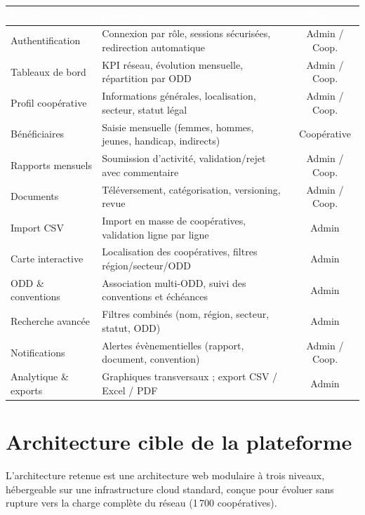 \documentclass[11pt,a4paper]{article}
\begin{document}
\begin{center}
\small
\renewcommand{\arraystretch}{1.18}
\begin{tabularx}{\textwidth}{@{}l Y c@{}}
\toprule
{}
\textcolor{white}{\textbf{Module}} & \textcolor{white}{\textbf{Fonction}} & \textcolor{white}{\textbf{Espace}} \\
\midrule
Authentification & Connexion par rôle, sessions sécurisées, redirection automatique & Admin / Coop. \\
 Tableaux de bord & KPI réseau, évolution mensuelle, répartition par ODD & Admin / Coop. \\
Profil coopérative & Informations générales, localisation, secteur, statut légal & Admin / Coop. \\
 Bénéficiaires & Saisie mensuelle (femmes, hommes, jeunes, handicap, indirects) & Coopérative \\
Rapports mensuels & Soumission d'activité, validation/rejet avec commentaire & Admin / Coop. \\
 Documents & Téléversement, catégorisation, versioning, revue & Admin / Coop. \\
Import CSV & Import en masse de coopératives, validation ligne par ligne & Admin \\
 Carte interactive & Localisation des coopératives, filtres région/secteur/ODD & Admin \\
ODD \& conventions & Association multi-ODD, suivi des conventions et échéances & Admin \\
 Recherche avancée & Filtres combinés (nom, région, secteur, statut, ODD) & Admin \\
Notifications & Alertes évènementielles (rapport, document, convention) & Admin / Coop. \\
 Analytique \& exports & Graphiques transversaux ; export CSV / Excel / PDF & Admin \\
\bottomrule
\end{tabularx}
\end{center}

\section{Architecture cible de la plateforme}
L'architecture retenue est une architecture web modulaire à trois niveaux, hébergeable sur une
infrastructure cloud standard, conçue pour évoluer sans rupture vers la charge complète du réseau
(1\,700 coopératives).
\end{document}
